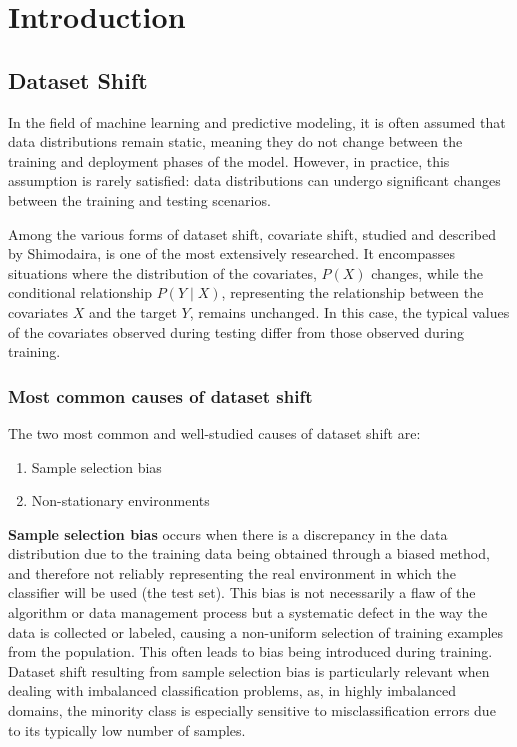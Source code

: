 \chapter{Introduction}

\section{Dataset Shift}


In the field of machine learning and predictive modeling, it is often assumed that data distributions remain static, meaning they do not change between the training and deployment phases of the model. However, in practice, this assumption is rarely satisfied: data distributions can undergo significant changes between the training and testing scenarios.

Among the various forms of dataset shift, covariate shift, studied and described by Shimodaira\cite{SHIMODAIRA2000227}, is one of the most extensively researched. It encompasses situations where the distribution of the covariates, $P(X)$ changes, while the conditional relationship $P(Y \mid X)$, representing the relationship between the covariates $X$ and the target $Y$, remains unchanged. In this case, the typical values of the covariates observed during testing differ from those observed during training.

	
\subsection{Most common causes of dataset shift}
	
The two most common and well-studied causes of dataset shift are:

\begin{enumerate}
	\item Sample selection bias
	\item Non-stationary environments
\end{enumerate}

\textbf{Sample selection bias} occurs when there is a discrepancy in the data distribution due to the training data being obtained through a biased method, and therefore not reliably representing the real environment in which the classifier will be used (the test set). This bias is not necessarily a flaw of the algorithm or data management process but a systematic defect in the way the data is collected or labeled, causing a non-uniform selection of training examples from the population. This often leads to bias being introduced during training. Dataset shift resulting from sample selection bias is particularly relevant when dealing with imbalanced classification problems, as, in highly imbalanced domains, the minority class is especially sensitive to misclassification errors due to its typically low number of samples.

